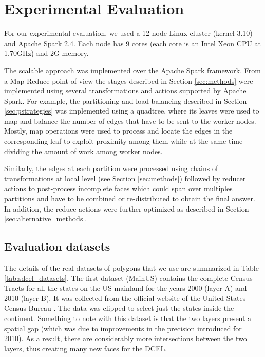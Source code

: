 \section{Experimental Evaluation} \label{sec:experiments}
For our experimental evaluation, we used a 12-node Linux cluster (kernel 3.10) and Apache Spark 2.4. Each node has 9 cores (each core is an Intel Xeon CPU at 1.70GHz) and 2G memory.

The scalable approach was implemented over the Apache Spark framework.  From a Map-Reduce point of view the stages described in Section \ref{sec:methods} were implemented using several transformations and actions supported by Apache Spark.  For example, the partitioning and load balancing described in Section \ref{sec:pstrategies} was implemented using a quadtree, where its leaves were used to map and balance the number of edges that have to be sent to the worker nodes.  Mostly, map operations were used to process and locate the edges in the corresponding leaf to exploit proximity among them while at the same time dividing the amount of work among worker nodes.

Similarly, the edges at each partition were processed using chains of transformations at local level (see Section \ref{sec:methods}) followed by reducer actions to post-process incomplete faces which could span over multiples partitions and have to be combined or re-distributed to obtain the final answer.  In addition, the reduce actions were further optimized as described in Section \ref{sec:alternative_methods}.

\subsection{Evaluation datasets}
The details of the real datasets of polygons that we use are summarized in Table \ref{tab:sdcel_datasets}. The first dataset (MainUS) contains the complete Census Tracts for all the states on the US mainland for the years 2000 (layer A) and 2010 (layer B). It was collected from the official website of the United States Census Bureau \cite{census_tract}. The data was clipped to select just the states inside the continent. Something to note with this dataset is that the two layers present a spatial gap (which was due to improvements in the precision introduced for 2010). As a result, there are considerably more intersections between the two layers, thus creating many new faces for the DCEL.

